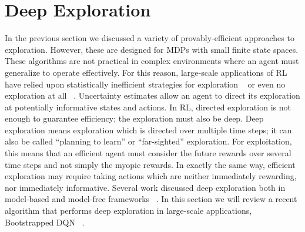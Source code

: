 \section{Deep Exploration} \label{deep_exploration}
In the previous section we discussed a variety of provably-efficient approaches to exploration. However, these are designed for MDPs with small finite state spaces. These algorithms are not practical in complex environments where an agent must generalize to operate effectively. For this reason, large-scale applications of RL have relied upon statistically inefficient strategies for exploration ~\cite{mnih2015humanlevel} or even no exploration at all ~\cite{Tesauro:1995:TDL:203330.203343}.
Uncertainty estimates allow an agent to direct its exploration at potentially informative states and actions. In RL, directed exploration is not enough to guarantee efficiency; the exploration must also be deep. Deep exploration means exploration which is directed over multiple time steps; it can also be called ``planning to learn'' or ``far-sighted'' exploration. For exploitation, this means that an efficient agent must consider the future rewards over several time steps and not simply the myopic rewards. In exactly the same way, efficient exploration may require taking actions which are neither immediately rewarding, nor immediately informative. Several work discussed deep exploration both in model-based and model-free frameworks ~\cite{Osband:2016:GEV:3045390.3045641,Osband2017WhyIP,NIPS2013_5185,DBLP:journals/corr/OsbandR15,Osband2017DeepEV}. In this section we will review a recent algorithm that performs deep exploration in large-scale applications, Bootstrapped DQN ~\cite{DBLP:journals/corr/OsbandBPR16}.
